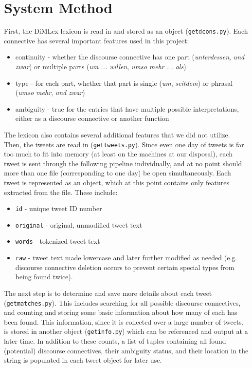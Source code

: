 \documentclass[11pt]{article}
\def\mono#1{\texttt{#1}}  %
\begin{document}
\section{System Method}

First, the DiMLex lexicon is read in and stored as an object (\mono{get\textunderscore dcons.py}).  Each connective has several important features used in this project:
\begin{itemize}
\renewcommand\labelitemi{--}
\item continuity - whether the discourse connective has one part (\emph{unterdessen}, \emph{und zwar}) or multiple parts (\emph{um ... willen}, \emph{umso mehr ... als})
\item type - for each part, whether that part is single (\emph{um}, \emph{seitdem}) or phrasal (\emph{umso mehr}, \emph{und zwar})
\item ambiguity - true for the entries that have multiple possible interpretations, either as a discourse connective or  another function
\end{itemize}
 The lexicon also contains several additional features that we did not utilize. \\
 
Then, the tweets are read in (\mono{get\textunderscore tweets.py}).  Since even one day of tweets is far too much to fit into memory (at least on the machines at our disposal), each tweet is sent through the following pipeline individually, and at no point should more than one file (corresponding to one day) be open simultaneously.  Each tweet is represented as an object, which at this point contains only features extracted from the file.  These include:
\begin{itemize}
\renewcommand\labelitemi{--}
\item \mono{id} - unique tweet ID number
\item \mono{\textunderscore original} - original, unmodified tweet text
\item \mono{words} - tokenized tweet text
\item \mono{raw} - tweet text made lowercase and later further modified as needed (e.g. discourse connective deletion occurs to prevent certain special types from being found twice).
\end{itemize} 

The next step is to determine and save more details about each tweet (\mono{get\textunderscore matches.py}).  This includes searching for all possible discourse connectives, and counting and storing some basic information about how many of each has been found.  This information, since it is collected over a large number of tweets, is stored in another object (\mono{get\textunderscore info.py}) which can be referenced and output at a later time.  In addition to these counts, a list of tuples containing all found (potential) discourse connectives, their ambiguity status, and their location in the string is populated in each tweet object for later use.\\
\end{document}
